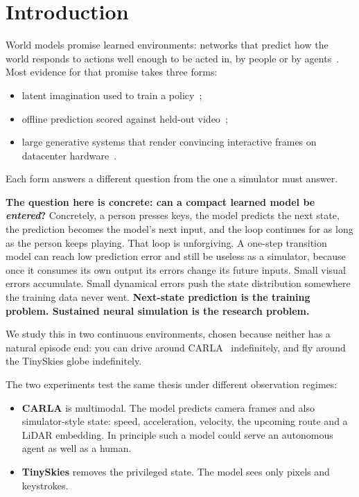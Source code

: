 \documentclass[11pt]{article}
\begin{document}
\section{Introduction}
\label{sec:intro}

World models promise learned environments: networks that predict how the world responds to actions well enough to be acted in, by people or by agents~\cite{ha2018worldmodels,alonso2024diamond,hafner2025dreamerv3,hafner2025dreamer4}. Most evidence for that promise takes three forms:
\begin{itemize}
  \item latent imagination used to train a policy~\cite{ha2018worldmodels,hafner2025dreamerv3};
  \item offline prediction scored against held-out video~\cite{oh2015action,chiappa2017recurrent};
  \item large generative systems that render convincing interactive frames on datacenter hardware~\cite{valevski2025gamengen,decart2024oasis,parkerholder2025genie3,kanervisto2025wham}.
\end{itemize}
Each form answers a different question from the one a simulator must answer.

\textbf{The question here is concrete: can a compact learned model be \emph{entered}?} Concretely, a person presses keys, the model predicts the next state, the prediction becomes the model's next input, and the loop continues for as long as the person keeps playing. That loop is unforgiving. A one-step transition model can reach low prediction error and still be useless as a simulator, because once it consumes its own output its errors change its future inputs. Small visual errors accumulate. Small dynamical errors push the state distribution somewhere the training data never went. \textbf{Next-state prediction is the training problem. Sustained neural simulation is the research problem.}

We study this in two continuous environments, chosen because neither has a natural episode end: you can drive around CARLA~\cite{dosovitskiy2017carla} indefinitely, and fly around the TinySkies globe indefinitely.

The two experiments test the same thesis under different observation regimes:
\begin{itemize}
  \item \textbf{CARLA} is multimodal. The model predicts camera frames and also simulator-style state: speed, acceleration, velocity, the upcoming route and a LiDAR embedding. In principle such a model could serve an autonomous agent as well as a human.
  \item \textbf{TinySkies} removes the privileged state. The model sees only pixels and keystrokes.
\end{itemize}
\end{document}
